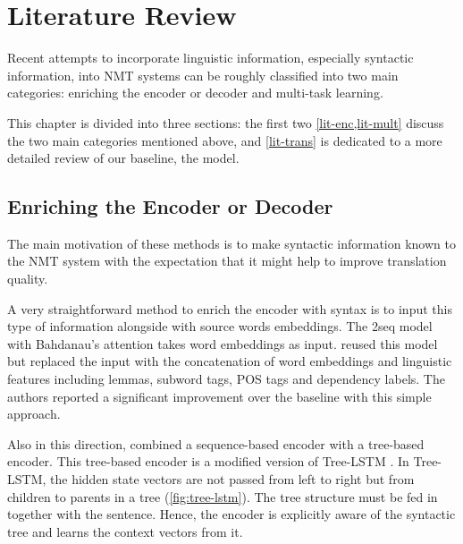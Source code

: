 \chapter{Literature Review}
\label{lit}

Recent attempts to incorporate linguistic information, especially syntactic information, into NMT systems can be roughly classified into two main categories: enriching the encoder or decoder and multi-task learning.

This chapter is divided into three sections: the first two \cref{lit-enc,lit-mult} discuss the two main categories mentioned above, and \cref{lit-trans} is dedicated to a more detailed review of our baseline, the \transformer model.

\section{Enriching the Encoder or Decoder}
\label{lit-enc}

The main motivation of these methods is to make syntactic information known to the NMT system with the expectation that it might help to improve translation quality.

A very straightforward method to enrich the encoder with syntax is to input this type of information alongside with source words embeddings.
The \seq2seq model with Bahdanau's attention takes word embeddings as input.
\cite{sennrich2016linguistic} reused this model but replaced the input with the concatenation of word embeddings and linguistic features including lemmas, subword tags, POS tags and dependency labels.
The authors reported a significant improvement over the baseline with this simple approach. 

Also in this direction, \cite{DBLP:conf/acl/EriguchiHT16} combined a sequence-based encoder with a tree-based encoder.
This tree-based encoder is a modified version of Tree-LSTM \citep{DBLP:conf/acl/TaiSM15}.
In Tree-LSTM, the hidden state vectors are not passed from left to right but from children to parents in a tree (\cref{fig:tree-lstm}).
The tree structure must be fed in together with the sentence.
Hence, the encoder is explicitly aware of the syntactic tree and learns the context vectors from it.


